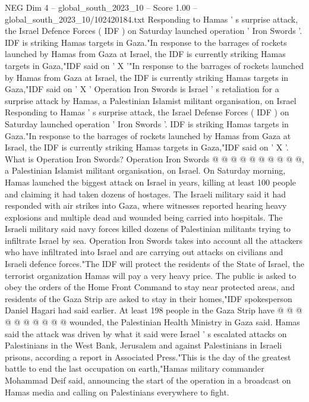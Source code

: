 \begin{textsample}{NEG Dim 4 – global\_south\_2023\_10 – Score 1.00 – global\_south\_2023\_10/102420184.txt}  \label{ex:f4_neg_032}
Responding to Hamas ' s surprise attack, the Israel Defence Forces ( IDF ) on Saturday launched operation ' Iron Swords '.
IDF is striking Hamas targets in Gaza."In response to the barrages of rockets launched by Hamas from Gaza at Israel, the IDF is currently striking Hamas targets in Gaza,"IDF said on ' X '"In response to the barrages of rockets launched by Hamas from Gaza at Israel, the IDF is currently striking Hamas targets in Gaza,"IDF said on ' X ' Operation Iron Swords is Israel ' s retaliation for a surprise attack by Hamas, a Palestinian Islamist militant organisation, on Israel Responding to Hamas ' s surprise attack, the Israel Defense Forces ( IDF ) on Saturday launched operation ' Iron Swords '.
IDF is striking Hamas targets in Gaza."In response to the barrages of rockets launched by Hamas from Gaza at Israel, the IDF is currently striking Hamas targets in Gaza,"IDF said on ' X '.
What is Operation Iron Swords?
Operation Iron Swords @ @ @ @ @ @ @ @ @ @, a Palestinian Islamist militant organisation, on Israel.
On Saturday morning, Hamas launched the biggest attack on Israel in years, killing at least 100 people and claiming it had taken dozens of hostages.
The Israeli military said it had responded with air strikes into Gaza, where witnesses reported hearing heavy explosions and multiple dead and wounded being carried into hospitals.
The Israeli military said navy forces killed dozens of Palestinian militants trying to infiltrate Israel by sea.
Operation Iron Swords takes into account all the attackers who have infiltrated into Israel and are carrying out attacks on civilians and Israeli defence forces."The IDF will protect the residents of the State of Israel, the terrorist organization Hamas will pay a very heavy price.
The public is asked to obey the orders of the Home Front Command to stay near protected areas, and residents of the Gaza Strip are asked to stay in their homes,"IDF spokesperson Daniel Hagari had said earlier.
At least 198 people in the Gaza Strip have @ @ @ @ @ @ @ @ @ @ wounded, the Palestinian Health Ministry in Gaza said.
Hamas said the attack was driven by what it said were Israel ' s escalated attacks on Palestinians in the West Bank, Jerusalem and against Palestinians in Israeli prisons, according a report in Associated Press."This is the day of the greatest battle to end the last occupation on earth,"Hamas military commander Mohammad Deif said, announcing the start of the operation in a broadcast on Hamas media and calling on Palestinians everywhere to fight.

\end{textsample}
